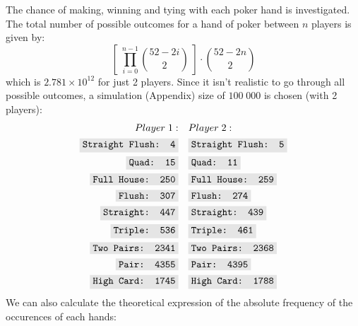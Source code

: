 \documentclass{article}
\newcommand{\code}[1]{\colorbox{codegray}{\texttt{#1}}}
\begin{document}
The chance of making, winning and tying with each poker hand is 
investigated. The total number of possible outcomes for a hand 
of poker between $n$ players is given by:
\[
    \left[ \; \prod_{i = 0}^{n - 1} \binom{52 - 2i}{2} \; \right] \cdot \binom{52 - 2n}{2}
\]
which is $2.781 \times 10^{12}$ for just 2 players. 
Since it isn't realistic to go through all possible outcomes,
a simulation (Appendix) size of $100 \; 000$ is chosen (with 2 players):
\begin{align*}
    \begin{split}
        Player \; 1: \\
        \code{Straight Flush: 4} \\
        \code{Quad: 15} \\
        \code{Full House: 250} \\
        \code{Flush: 307} \\
        \code{Straight: 447} \\
        \code{Triple: 536} \\
        \code{Two Pairs: 2341} \\
        \code{Pair: 4355} \\
        \code{High Card: 1745} 
    \end{split}
    \quad
    \begin{split}
        & Player \; 2: \\
        & \code{Straight Flush: 5} \\
        & \code{Quad: 11} \\
        & \code{Full House: 259} \\
        & \code{Flush: 274} \\
        & \code{Straight: 439} \\
        & \code{Triple: 461} \\
        & \code{Two Pairs: 2368} \\
        & \code{Pair: 4395} \\
        & \code{High Card: 1788} 
    \end{split}
\end{align*}
We can also calculate the theoretical expression of the 
absolute frequency of the occurences of each hands:
\end{document}
